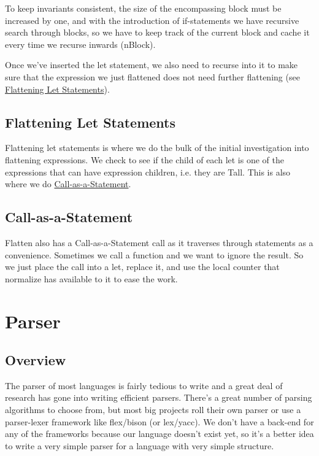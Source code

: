 \documentclass[journal=jacsat, manuscript=article]{achemso}
\begin{document}
To keep invariants consistent, the size of the encompassing block must be increased by one,
and with the introduction of if-statements we have recursive search through blocks, so we
have to keep track of the current block and cache it every time we recurse inwards
(nBlock).

Once we've inserted the let statement, we also need to recurse into it to make sure that
the expression we just flattened does not need further flattening 
(see \hyperref[sec:Flattening Let Statements]{Flattening Let Statements}).

\subsection{Flattening Let Statements}

Flattening let statements is where we do the bulk of the initial investigation into flattening
expressions. We check to see if the child of each let is one of the expressions that can have
expression children, i.e. they are Tall. This is also where we do \hyperref[sec:Call-as-a-Statement]{Call-as-a-Statement}.

\subsection{Call-as-a-Statement}

Flatten also has a Call-as-a-Statement call as it traverses through statements as a
convenience. Sometimes we call a function and we want to ignore the result. So we just
place the call into a let, replace it, and use the local counter that normalize has available to
it to ease the work.

\section{Parser}

\subsection{Overview}

The parser of most languages is fairly tedious to write and a great deal of research has
gone into writing efficient parsers. There's a great number of parsing algorithms to choose
from, but most big projects roll their own parser or use a parser-lexer framework like
flex/bison (or lex/yacc). We don't have a back-end for any of the frameworks because our
language doesn't exist yet, so it's a better idea to write a very simple parser for a language
with very simple structure.
\end{document}

